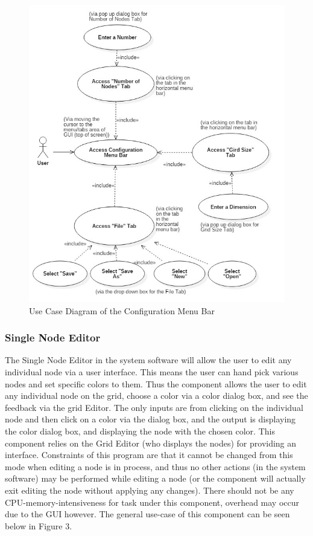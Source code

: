 \documentclass[12pt]{article}
\begin{document}
	\begin{figure}[ht!]
		\centering
		\includegraphics[width=170mm]{Configuration_Editor.JPG}
		\caption{Use Case Diagram of the Configuration Menu Bar \label{overflow}}
	\end{figure}
	
	\subsubsection {Single Node Editor}
	The Single Node Editor in the system software will allow the user to edit any individual node via a user interface. This means the user can hand pick various nodes and set specific colors to them. Thus the component allows the user to edit any individual node on the grid, choose a color via a color dialog box, and see the feedback via the grid Editor. The only inputs are from clicking on the individual node and then click on a color via the dialog box, and the output is displaying the color dialog box, and displaying the node with the chosen color. This component relies on the Grid Editor (who displays the nodes) for providing an interface. Constraints of this program are that it cannot be changed from this mode when editing a node is in process, and thus no other actions (in the system software) may be performed while editing a node (or the component will actually exit editing the node without applying any changes). There should not be any CPU-memory-intensiveness for task under this component, overhead may occur due to the GUI however. The general use-case of this component can be seen below in Figure 3.
	
\end{document}
